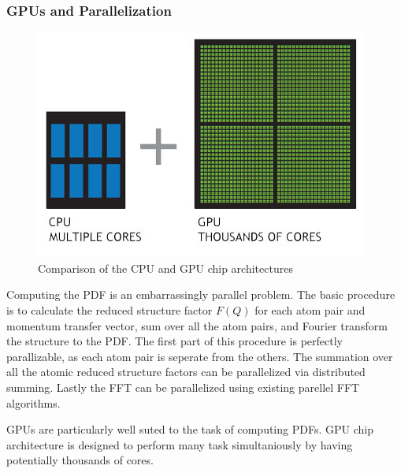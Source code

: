 \subsubsection{GPUs and Parallelization}
\begin{figure}
    \includegraphics[width=\textwidth]{cpu-and-gpu}
    \caption{Comparison of the CPU and GPU chip architectures}
    \label{fig:cpu_vs_gpu}
\end{figure}
Computing the PDF is an embarrassingly parallel problem.
The basic procedure is to calculate the reduced structure factor $F(Q)$ for each atom pair and momentum transfer vector, sum over all the atom pairs, and Fourier transform the structure to the PDF.
The first part of this procedure is perfectly parallizable, as each atom pair is seperate from the others.
The summation over all the atomic reduced structure factors can be parallelized via distributed summing.
Lastly the FFT can be parallelized using existing parellel FFT algorithms.

GPUs are particularly well suted to the task of computing PDFs.
GPU chip architecture is designed to perform many task simultaniously by having potentially thousands of cores.

